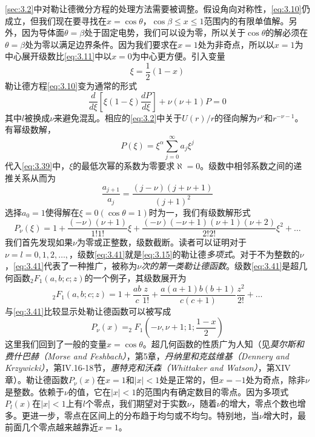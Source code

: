 \documentclass[12pt]{book}
\numberwithin{equation}{chapter}
\numberwithin{figure}{chapter}
\numberwithin{footnote}{page}
\begin{document}
\autoref{sec:3.2}中对勒让德微分方程的处理方法需要被调整。假设角向对称性，\autoref{eq:3.10}仍成立，但我们现在要寻找在$x=\cos\theta$，$\cos\beta\leq x\leq1$范围内的有限单值解。另外，因为导体面$\theta=\beta$处于固定电势，我们可以设为零，所以关于$\cos\theta$的解必须在$\theta=\beta$处为零以满足边界条件。因为我们要求在$x=1$处为非奇点，所以以$x=1$为中心展开级数比\autoref{eq:3.11}中以$x=0$为中心更方便。引入变量
$$\xi=\frac{1}{2}(1-x)$$
勒让德方程\autoref{eq:3.10}变为通常的形式
\begin{equation}\label{eq:3.39}
    \frac{d}{d\xi}[\xi(1-\xi)\frac{dP}{d\xi}]+\nu(\nu+1)P=0    
\end{equation}
其中$l$被换成$\nu$来避免混乱。相应的\autoref{eq:3.2}中关于$U(r)/r$的径向解为$r^\nu$和$r^{-\nu-1}$。有幂级数解，
$$P(\xi)=\xi^\alpha\sum_{j=0}^\infty a_j\xi^j$$
代入\autoref{eq:3.39}中，$\xi$的最低次幂的系数为零要求$\aleph=0$。级数中相邻系数之间的递推关系从而为
\begin{equation}\label{eq:3.40}
    \frac{a_{j+1}}{a_j}=\frac{(j-\nu)(j+\nu+1)}{(j+1)^2}
\end{equation}
选择$a_0=1$使得解在$\xi=0(\cos\theta=1)$时为一，我们有级数解形式
\begin{equation}\label{eq:3.41}
    P_{\nu}(\xi)=1+\frac{(-\nu)(\nu+1)}{1!1!}\xi+\frac{(-\nu)(-\nu+1)(\nu+1)(\nu+2)}{2!2!}\xi^2+\dots
\end{equation}
我们首先发现如果$\nu$为零或正整数，级数截断。读者可以证明对于$\nu=l=0,1,2,\dots,$，级数\autoref{eq:3.41}就是\autoref{eq:3.15}的勒让德\textit{多项式}。对于不为整数的$\nu$，\autoref{eq:3.41}代表了一种推广，被称为\textit{$\nu$次的第一类勒让德函数}。级数\autoref{eq:3.41}是超几何函数$_2F_1(a,b;c;z)$的一个例子，其级数展开为
$$_2F_1(a,b;c;z)=1+\frac{ab}{c}\frac{z}{1!}+\frac{a(a+1)b(b+1)}{c(c+1)}\frac{z^2}{2!}+\dots$$
与\autoref{eq:3.41}比较显示处勒让德函数可以被写成
\begin{equation}\label{eq:3.42}
    P_\nu(x)=_2F_1(-\nu,\nu+1;1;\frac{1-x}{2})
\end{equation}
这里我们回到了一般的变量$x=\cos\theta$。超几何函数的性质广为人知（见\textit{莫尔斯和费什巴赫（Morse and Feshbach）}，第5章，\textit{丹纳里和克兹维基（Dennery and Krzywicki）}，第IV.16-18节，\textit{惠特克和沃森（Whittaker and Watson）}，第XIV章）。勒让德函数$P_\nu(x)$在$x=1$和$|x|<1$处是正常的，但$x=-1$处为奇点，除非$\nu$是整数。依赖于$\nu$的值，它在$|x|<1$的范围内有确定数目的零点。因为多项式$P_l(x)$在$|x|<1$上有$l$个零点，我们期望对于实数$\nu$，随着$\nu$的增大，零点个数也增多。更进一步，零点在区间上的分布趋于均匀或不均匀。特别地，当$\nu$增大时，最前面几个零点越来越靠近$x=1$。
\end{document}
